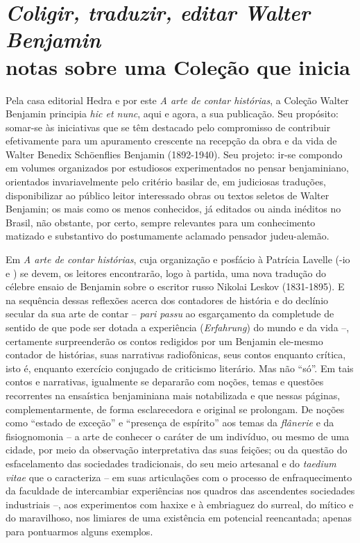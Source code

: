 \chapter*{\textit{Coligir, traduzir, editar Walter Benjamin}\\ notas sobre uma Coleção que inicia}



\noindent Pela casa editorial Hedra e por este \emph{A arte de contar
histórias}, a Coleção Walter Benjamin principia \emph{hic et nunc}, aqui
e agora, a sua publicação. Seu propósito: somar-se às iniciativas que se
têm destacado pelo compromisso de contribuir efetivamente para um
apuramento crescente na recepção da obra e da vida de Walter Benedix
Schöenflies Benjamin (1892-1940). Seu projeto: ir-se compondo em volumes
organizados por estudiosos experimentados no pensar benjaminiano,
orientados invariavelmente pelo critério basilar de, em judiciosas
traduções, disponibilizar ao público leitor interessado obras ou textos
seletos de Walter Benjamin; os mais como os menos conhecidos, já
editados ou ainda inéditos no Brasil, não obstante, por certo, sempre
relevantes para um conhecimento matizado e substantivo do postumamente
aclamado pensador judeu-alemão.

Em \emph{A arte de contar histórias}, cuja organização e posfácio à
Patrícia Lavelle (-io e ) se devem, os leitores encontrarão,
logo à partida, uma nova tradução do célebre ensaio de Benjamin sobre o
escritor russo Nikolai Leskov (1831-1895). E na sequência dessas
reflexões acerca dos contadores de história e do declínio secular da sua
arte de contar -- \emph{pari passu} ao esgarçamento da completude de
sentido de que pode ser dotada a experiência (\emph{Erfahrung}) do mundo
e da vida --, certamente surpreenderão os contos redigidos por um
Benjamin ele-mesmo contador de histórias, suas narrativas radiofônicas,
seus contos enquanto crítica, isto é, enquanto exercício conjugado de
criticismo literário. Mas não ``só''. Em tais contos e narrativas,
igualmente se depararão com noções, temas e questões recorrentes na
ensaística benjaminiana mais notabilizada e que nessas páginas,
complementarmente, de forma esclarecedora e original se prolongam. De
noções como ``estado de exceção'' e ``presença de espírito'' aos temas da \emph{flânerie} e da fisiognomonia -- a arte de conhecer o caráter de um indivíduo, ou mesmo
de uma cidade, por meio da observação interpretativa das suas feições;
ou da questão do esfacelamento das sociedades tradicionais, do seu meio
artesanal e do \emph{taedium vitae} que o caracteriza -- em suas
articulações com o processo de enfraquecimento da faculdade de
intercambiar experiências nos quadros das ascendentes sociedades
industriais --, aos experimentos com haxixe e à embriaguez do surreal,
do mítico e do maravilhoso, nos limiares de uma existência em potencial
reencantada; apenas para pontuarmos alguns exemplos.

